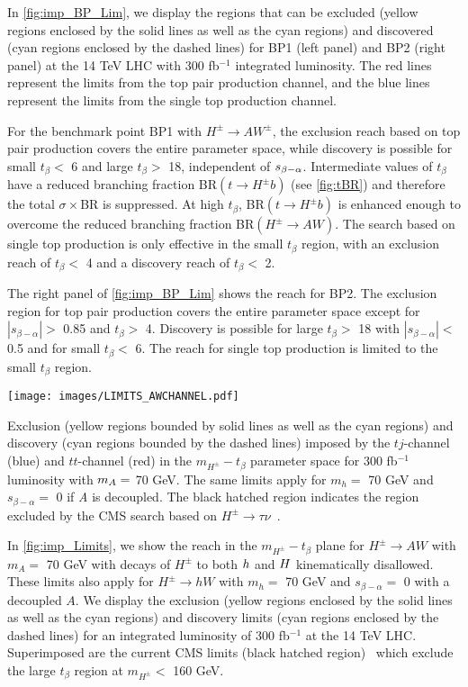 In \autoref{fig:imp_BP_Lim}, we display the regions that can be excluded (yellow regions enclosed by the solid lines as well as the cyan regions) and discovered (cyan regions enclosed by the dashed lines) for BP1 (left panel) and BP2 (right panel) at the 14 TeV LHC with 300 fb$^{-1}$ integrated luminosity. The red lines represent the limits from the top pair production channel, and the blue lines represent the limits from the single top production channel.

For the benchmark point BP1 with $H^{\pm} \rightarrow AW^{\pm}$, the exclusion reach based on top pair production covers the entire parameter space, while discovery is possible for small $t_{\beta}<$ 6 and large $t_{\beta}>$ 18, independent of $s_{\beta-\alpha}$. Intermediate values of $t_{\beta}$ have a reduced branching fraction BR$(t \rightarrow H^{\pm} b)$ (see \autoref{fig:tBR}) and therefore the total $\sigma\times$BR is suppressed. At high $t_{\beta}$, BR$(t \rightarrow H^{\pm}b)$ is enhanced enough to overcome the reduced branching fraction BR$(H^{\pm} \rightarrow AW)$. The search based on single top production is only effective in the small $t_{\beta}$ region, with an exclusion reach of $t_{\beta} <$ 4 and a discovery reach of $t_{\beta}<$ 2. 

The right panel of \autoref{fig:imp_BP_Lim} shows the reach for BP2. The exclusion region for top pair production covers the entire parameter space except for $|s_{\beta-\alpha}| >$ 0.85 and $t_{\beta}>$ 4. Discovery is possible for large $t_{\beta}>$ 18 with $|s_{\beta-\alpha}|<$ 0.5 and for small $t_{\beta}<$ 6. The reach for single top production is limited to the small $t_{\beta}$ region.
\begin{marginfigure}[1in]
 \centering
 	\texttt{[image: images/LIMITS\_AWCHANNEL.pdf]}
    \caption{Exclusion (yellow regions bounded by solid lines as well as the cyan regions) and discovery (cyan regions bounded by the dashed lines) imposed by the $tj$-channel (blue) and $tt$-channel (red) in the $m_{H^{\pm}}-t_{\beta}$ parameter space for 300 fb$^{-1}$ luminosity with $m_A=$ 70 GeV. The same limits apply for $m_{h}=$ 70 GeV and $s_{\beta-\alpha}=$ 0 if \emph{A} is decoupled. The black hatched region indicates the region excluded by the CMS search based on $H^{\pm} \rightarrow \tau \nu$~\cite{CMS:2014cdp}.}
\label{fig:imp_Limits}
\end{marginfigure}

In \autoref{fig:imp_Limits}, we show the reach in the $m_{H^{\pm}}-t_{\beta}$ plane for $H^{\pm} \rightarrow AW$ with $m_A=$ 70 GeV with decays of $H^\pm$ to both $h$ and $H$ kinematically disallowed. These limits also apply for $H^{\pm} \rightarrow hW$ with $m_{h}=$ 70 GeV and $s_{\beta-\alpha}=$ 0 with a decoupled $A$. We display the exclusion (yellow regions enclosed by the solid lines as well as the cyan regions) and discovery limits (cyan regions enclosed by the dashed lines) for an integrated luminosity of 300 fb$^{-1}$ at the 14 TeV LHC. Superimposed are the current CMS limits (black hatched region)~\cite{CMS:2014cdp} which exclude the large $t_{\beta}$ region at $m_{H^\pm}<$ 160 GeV. 

